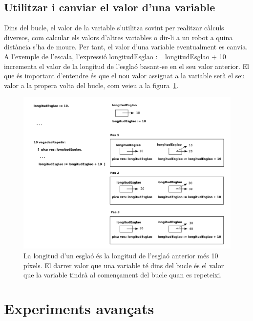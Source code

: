 \subsection{Utilitzar i canviar el valor d'una variable}
Dins del bucle, el valor de la variable s'utilitza sovint per realitzar càlculs diversos, com calcular els valors d'altres variables o dir-li a un robot a quina distància s'ha de moure. Per tant, el valor d'una variable eventualment es canvia. A l'exemple de l'escala, l'expressió \textsf{longitudEsglao := longitudEsglao + 10} incrementa el valor de la longitud de l'esglaó basant-se en el seu valor anterior. El que és important d'entendre és que el nou valor assignat a la variable serà el seu valor a la propera volta del bucle, com veieu a la figura~\ref{fig1004}.

\begin{figure}
\begin{center}
\includegraphics[scale=0.135]{Imatges/figura10-4.pdf}
\end{center}
\caption{La longitud d'un esglaó és la longitud de l'esglaó anterior més 10 píxels. El darrer valor que una variable té dins del bucle és el valor que la variable tindrà al començament del bucle quan es repeteixi.}
\label{fig1004}
\end{figure}
\newpage

\section{Experiments avançats}

